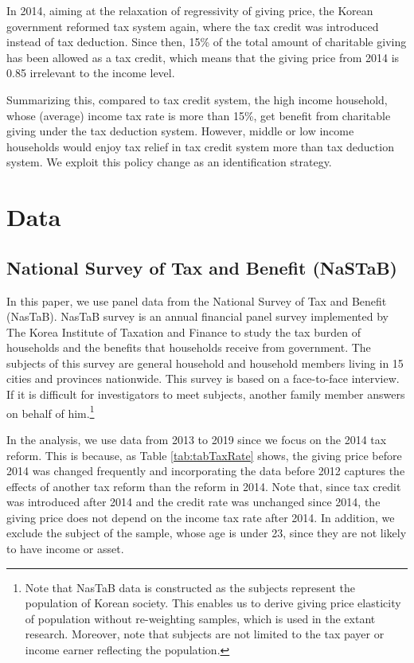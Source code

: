 \documentclass[ review  , 3p ]{elsarticle}
\begin{document}
  In 2014, aiming at the relaxation of regressivity of giving price, the Korean government reformed tax system again, where the tax credit was introduced instead of tax deduction. Since then, 15\% of the total amount of charitable giving has been allowed as a tax credit, which means that the giving price from 2014 is 0.85 irrelevant to the income level.

  Summarizing this, compared to tax credit system, the high income household, whose (average) income tax rate is more than 15\%, get benefit from charitable giving under the tax deduction system. However, middle or low income households would enjoy tax relief in tax credit system more than tax deduction system. We exploit this policy change as an identification strategy.

  \hypertarget{data}{%
  \section{Data}\label{data}}

  \hypertarget{national-survey-of-tax-and-benefit-nastab}{%
  \subsection{National Survey of Tax and Benefit (NaSTaB)}\label{national-survey-of-tax-and-benefit-nastab}}

  In this paper, we use panel data from the National Survey of Tax and Benefit (NasTaB).
  NasTaB survey is an annual financial panel survey
  implemented by The Korea Institute of Taxation and Finance
  to study the tax burden of households and the benefits that households receive from government.
  The subjects of this survey are general household and household members living in 15 cities
  and provinces nationwide.
  This survey is based on a face-to-face interview.
  If it is difficult for investigators to meet subjects, another family member answers on behalf of him.\footnote{Note that NasTaB data is constructed as the subjects represent the population of Korean society. This enables us to derive giving price elasticity of population without re-weighting samples, which is used in the extant research. Moreover, note that subjects are not limited to the tax payer or income earner reflecting the population.}

  In the analysis, we use data from 2013 to 2019 since we focus on the 2014 tax reform. This is because, as Table \ref{tab:tabTaxRate} shows, the giving price before 2014 was changed frequently and incorporating the data before 2012 captures the effects of another tax reform than the reform in 2014. Note that, since tax credit was introduced after 2014 and the credit rate was unchanged since 2014, the giving price does not depend on the income tax rate after 2014.
  In addition, we exclude the subject of the sample, whose age is under 23, since they are not likely to have income or asset.
\end{document}

